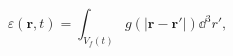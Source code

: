 \begin{equation}
\varepsilon(\mathbf{r},t) = \int_{V_f(t)}{g(|\mathbf{r} -
\mathbf{r'}|) \dd^3 r' },
 \label{eq:voidfraction}
\end{equation}
